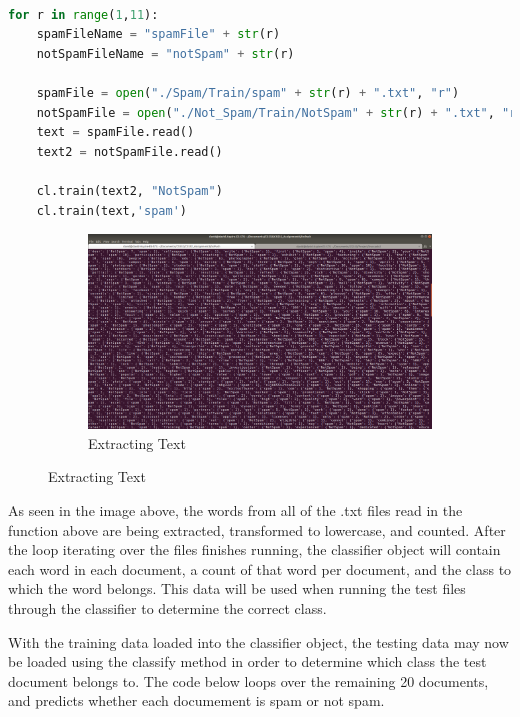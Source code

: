 \documentclass[11pt]{scrartcl} %
\begin{document}
\begin{lstlisting}[language = Python, caption=Pass file input stream as string to classifier]

for r in range(1,11):
    spamFileName = "spamFile" + str(r)
    notSpamFileName = "notSpam" + str(r)
 
    spamFile = open("./Spam/Train/spam" + str(r) + ".txt", "r")
    notSpamFile = open("./Not_Spam/Train/NotSpam" + str(r) + ".txt", "r")
    text = spamFile.read()
    text2 = notSpamFile.read()

    cl.train(text2, "NotSpam")
    cl.train(text,'spam')

\end{lstlisting} \bigskip 


\begin{figure}[h!]
  \centering
  \begin{subfigure}[b]{\linewidth}
    \includegraphics[width=\linewidth, height=.5\textheight]{../Figures/extractText.png}
    \caption{Extracting Text}
  \end{subfigure}
\end{figure}

\tabto{2.0cm} As seen in the image above, the words from all of the .txt files read in the function above are being extracted, transformed to lowercase, and counted. After the loop iterating over the files finishes running, the classifier object will contain each word in each document, a count of that word per document, and the class to which the word belongs. This data will be used when running the test files through the classifier to determine the correct class.
\pagebreak
  

\tabto{2.0cm} With the training data loaded into the classifier object, the testing data may now be loaded using the classify method in order to determine which class the test document belongs to. The code below loops over the remaining 20 documents, and predicts whether each documement is spam or not spam. 
\end{document}

